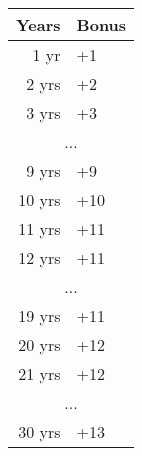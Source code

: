 \begin{tabular}{rl}
Years & Bonus \\
\hline
1 yr & +1 \\
2 yrs & +2 \\
3 yrs & +3 \\
\multicolumn{2}{c}{...} \\
9 yrs & +9 \\
10 yrs & +10 \\
11 yrs & +11 \\
12 yrs & +11 \\
\multicolumn{2}{c}{...} \\
19 yrs & +11 \\
20 yrs & +12 \\
21 yrs & +12 \\
\multicolumn{2}{c}{...} \\
30 yrs & +13 \\
\end{tabular}


